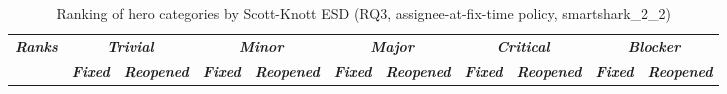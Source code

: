 \begin{table}[htbp]
    \centering
    \scriptsize
    \caption{Ranking of hero categories by Scott-Knott ESD (RQ3, assignee-at-fix-time policy, smartshark\_2\_2)}
    \label{tab:rq3-herorank-assignee-at-fix-time}
    \begin{adjustbox}{max width=\textwidth}
        \begin{tabular}{|c|cc|cc|cc|cc|cc|}
            \hline
            \multirow{2}{*}{\textit{\textbf{Ranks}}} & \multicolumn{2}{c|}{\textit{\textbf{Trivial}}} & \multicolumn{2}{c|}{\textit{\textbf{Minor}}} & \multicolumn{2}{c|}{\textit{\textbf{Major}}} & \multicolumn{2}{c|}{\textit{\textbf{Critical}}} & \multicolumn{2}{c|}{\textit{\textbf{Blocker}}} \\ \cline{2-11}
            & \multicolumn{1}{c|}{\textit{\textbf{Fixed}}} & \textit{\textbf{Reopened}} & \multicolumn{1}{c|}{\textit{\textbf{Fixed}}} & \textit{\textbf{Reopened}} & \multicolumn{1}{c|}{\textit{\textbf{Fixed}}} & \textit{\textbf{Reopened}} & \multicolumn{1}{c|}{\textit{\textbf{Fixed}}} & \textit{\textbf{Reopened}} & \multicolumn{1}{c|}{\textit{\textbf{Fixed}}} & \textit{\textbf{Reopened}} \\ \hline

\end{tabular}
\end{adjustbox}
\end{table}
